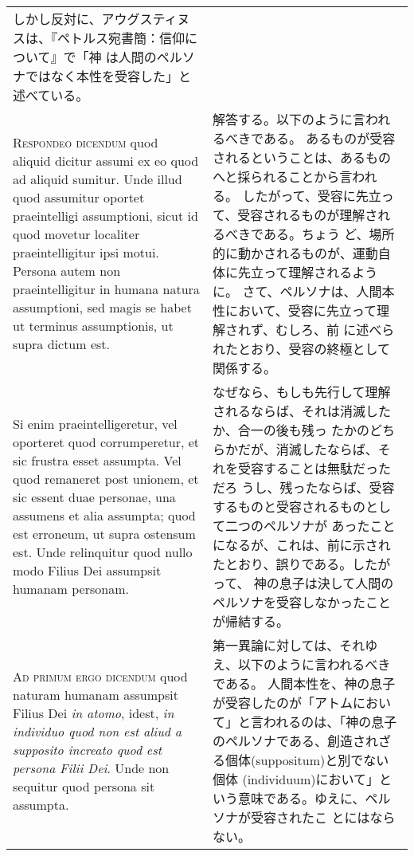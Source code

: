 \documentclass[10pt]{jsarticle} %
\begin{document}
\begin{longtable}{p{21em}p{21em}}
しかし反対に、アウグスティヌスは、『ペトルス宛書簡：信仰について』で「神
 は人間のペルソナではなく本性を受容した」と述べている。

\\




{\scshape Respondeo dicendum} quod aliquid dicitur assumi ex eo quod ad aliquid
sumitur. Unde illud quod assumitur oportet praeintelligi assumptioni,
sicut id quod movetur localiter praeintelligitur ipsi motui. Persona
autem non praeintelligitur in humana natura assumptioni, sed magis se
habet ut terminus assumptionis, ut supra dictum est. 

&

解答する。以下のように言われるべきである。
あるものが受容されるということは、あるものへと採られることから言われる。
したがって、受容に先立って、受容されるものが理解されるべきである。ちょう
 ど、場所的に動かされるものが、運動自体に先立って理解されるように。
さて、ペルソナは、人間本性において、受容に先立って理解されず、むしろ、前
 に述べられたとおり、受容の終極として関係する。


\\



Si enim
praeintelligeretur, vel oporteret quod corrumperetur, et sic frustra
esset assumpta. Vel quod remaneret post unionem, et sic essent duae
personae, una assumens et alia assumpta; quod est erroneum, ut supra
ostensum est. Unde relinquitur quod nullo modo Filius Dei assumpsit
humanam personam.


&

なぜなら、もしも先行して理解されるならば、それは消滅したか、合一の後も残っ
 たかのどちらかだが、消滅したならば、それを受容することは無駄だっただろ
 うし、残ったならば、受容するものと受容されるものとして二つのペルソナが
 あったことになるが、これは、前に示されたとおり、誤りである。したがって、
 神の息子は決して人間のペルソナを受容しなかったことが帰結する。


\\




{\scshape Ad primum ergo dicendum} quod naturam humanam assumpsit Filius Dei {\itshape in
atomo}, idest, {\itshape in individuo quod non est aliud a supposito increato quod
est persona Filii Dei}. Unde non sequitur quod persona sit assumpta.


&

第一異論に対しては、それゆえ、以下のように言われるべきである。
人間本性を、神の息子が受容したのが「アトムにおいて」と言われるのは、「神の息子
 のペルソナである、創造されざる個体(suppositum)と別でない個体
 (individuum)において」という意味である。ゆえに、ペルソナが受容されたこ
 とにはならない。


\end{longtable}
\end{document}
